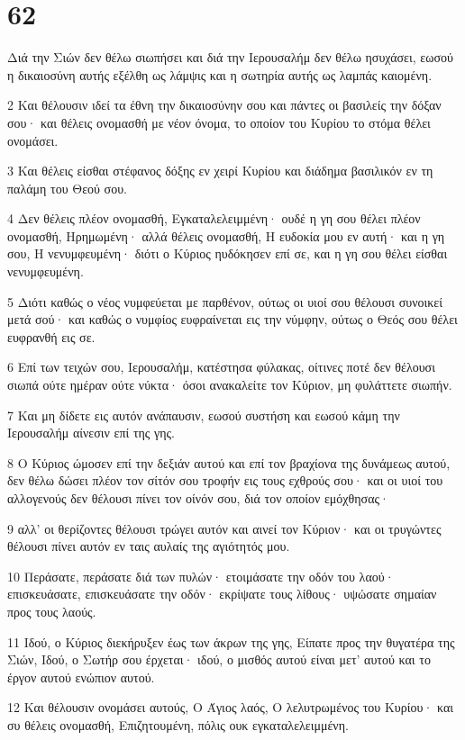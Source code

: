 \chapter{62}

\par Διά την Σιών δεν θέλω σιωπήσει και διά την Ιερουσαλήμ δεν θέλω ησυχάσει, εωσού η δικαιοσύνη αυτής εξέλθη ως λάμψις και η σωτηρία αυτής ως λαμπάς καιομένη.
\par 2 Και θέλουσιν ιδεί τα έθνη την δικαιοσύνην σου και πάντες οι βασιλείς την δόξαν σου· και θέλεις ονομασθή με νέον όνομα, το οποίον του Κυρίου το στόμα θέλει ονομάσει.
\par 3 Και θέλεις είσθαι στέφανος δόξης εν χειρί Κυρίου και διάδημα βασιλικόν εν τη παλάμη του Θεού σου.
\par 4 Δεν θέλεις πλέον ονομασθή, Εγκαταλελειμμένη· ουδέ η γη σου θέλει πλέον ονομασθή, Ηρημωμένη· αλλά θέλεις ονομασθή, Η ευδοκία μου εν αυτή· και η γη σου, Η νενυμφευμένη· διότι ο Κύριος ηυδόκησεν επί σε, και η γη σου θέλει είσθαι νενυμφευμένη.
\par 5 Διότι καθώς ο νέος νυμφεύεται με παρθένον, ούτως οι υιοί σου θέλουσι συνοικεί μετά σού· και καθώς ο νυμφίος ευφραίνεται εις την νύμφην, ούτως ο Θεός σου θέλει ευφρανθή εις σε.
\par 6 Επί των τειχών σου, Ιερουσαλήμ, κατέστησα φύλακας, οίτινες ποτέ δεν θέλουσι σιωπά ούτε ημέραν ούτε νύκτα· όσοι ανακαλείτε τον Κύριον, μη φυλάττετε σιωπήν.
\par 7 Και μη δίδετε εις αυτόν ανάπαυσιν, εωσού συστήση και εωσού κάμη την Ιερουσαλήμ αίνεσιν επί της γης.
\par 8 Ο Κύριος ώμοσεν επί την δεξιάν αυτού και επί τον βραχίονα της δυνάμεως αυτού, δεν θέλω δώσει πλέον τον σίτόν σου τροφήν εις τους εχθρούς σου· και οι υιοί του αλλογενούς δεν θέλουσι πίνει τον οίνόν σου, διά τον οποίον εμόχθησας·
\par 9 αλλ' οι θερίζοντες θέλουσι τρώγει αυτόν και αινεί τον Κύριον· και οι τρυγώντες θέλουσι πίνει αυτόν εν ταις αυλαίς της αγιότητός μου.
\par 10 Περάσατε, περάσατε διά των πυλών· ετοιμάσατε την οδόν του λαού· επισκευάσατε, επισκευάσατε την οδόν· εκρίψατε τους λίθους· υψώσατε σημαίαν προς τους λαούς.
\par 11 Ιδού, ο Κύριος διεκήρυξεν έως των άκρων της γης, Είπατε προς την θυγατέρα της Σιών, Ιδού, ο Σωτήρ σου έρχεται· ιδού, ο μισθός αυτού είναι μετ' αυτού και το έργον αυτού ενώπιον αυτού.
\par 12 Και θέλουσιν ονομάσει αυτούς, Ο Άγιος λαός, Ο λελυτρωμένος του Κυρίου· και συ θέλεις ονομασθή, Επιζητουμένη, πόλις ουκ εγκαταλελειμμένη.

